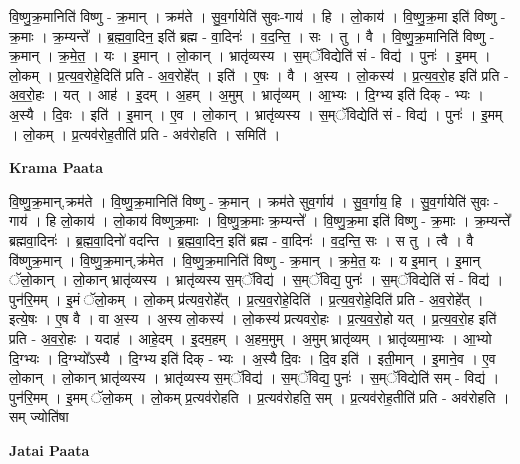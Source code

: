 \documentclass[17pt]{extarticle}
\begin{document}
वि॒ष्णु॒क्र॒मानिति॑ विष्णु - क्र॒मान् । क्रम॑ते । सु॒व॒र्गायेति॑ सुवः-गाय॑ । हि । लो॒काय॑ । वि॒ष्णु॒क्र॒मा इति॑ विष्णु - क्र॒माः । क्र॒म्यन्ते᳚ । ब्र॒ह्म॒वा॒दिन॒ इति॑ ब्रह्म - वा॒दिनः॑ । व॒द॒न्ति॒ । सः । तु । वै । वि॒ष्णु॒क्र॒मानिति॑ विष्णु - क्र॒मान् । क्र॒मे॒त॒ । यः । इ॒मान् । लो॒कान् । भ्रातृ॑व्यस्य । स॒म्ॅविद्येति॑ सं - विद्य॑ । पुनः॑ । इ॒मम् । लो॒कम् । प्र॒त्य॒व॒रोहे॒दिति॑ प्रति - अ॒व॒रोहे᳚त् । इति॑ । ए॒षः । वै । अ॒स्य । लो॒कस्य॑ । प्र॒त्य॒व॒रो॒ह इति॑ प्रति - अ॒व॒रो॒हः । यत् । आह॑ । इ॒दम् । अ॒हम् । अ॒मुम् । भ्रातृ॑व्यम् । आ॒भ्यः । दि॒ग्भ्य इति॑ दिक् - भ्यः । अ॒स्यै । दि॒वः । इति॑ । इ॒मान् । ए॒व । लो॒कान् । भ्रातृ॑व्यस्य । स॒म्ॅविद्येति॑ सं - विद्य॑ । पुनः॑ । इ॒मम् । लो॒कम् । प्र॒त्यव॑रोह॒तीति॑ प्रति - अव॑रोहति । समिति॑ ।  \newline


\textbf{Krama Paata} \newline

वि॒ष्णु॒क्र॒मान्,क्रम॑ते । वि॒ष्णु॒क्र॒मानिति॑ विष्णु - क्र॒मान् । क्रम॑ते सुव॒र्गाय॑ । सु॒व॒र्गाय॒ हि । सु॒व॒र्गायेति॑ सुवः - गाय॑ । हि लो॒काय॑ । लो॒काय॑ विष्णुक्र॒माः । वि॒ष्णु॒क्र॒माः क्र॒म्यन्ते᳚ । वि॒ष्णु॒क्र॒मा इति॑ विष्णु - क्र॒माः । क्र॒म्यन्ते᳚ ब्रह्मवा॒दिनः॑ । ब्र॒ह्म॒वा॒दिनो॑ वदन्ति । ब्र॒ह्म॒वा॒दिन॒ इति॑ ब्रह्म - वा॒दिनः॑ । व॒द॒न्ति॒ सः । स तु । त्वै । वै वि॑ष्णुक्र॒मान् । वि॒ष्णु॒क्र॒मान्,क्र॑मेत । वि॒ष्णु॒क्र॒मानिति॑ विष्णु - क्र॒मान् । क्र॒मे॒त॒ यः । य इ॒मान् । इ॒मान् ॅलो॒कान् । लो॒कान् भ्रातृ॑व्यस्य । भ्रातृ॑व्यस्य स॒म्ॅविद्य॑ । स॒म्ॅविद्य॒ पुनः॑ । स॒म्ॅविद्येति॑ सं - विद्य॑ । पुन॑रि॒मम् । इ॒मं ॅलो॒कम् । लो॒कम् प्र॑त्यव॒रोहे᳚त् । प्र॒त्य॒व॒रोहे॒दिति॑ । प्र॒त्य॒व॒रोहे॒दिति॑ प्रति - अ॒व॒रोहे᳚त् । इत्ये॒षः । ए॒ष वै । वा अ॒स्य । अ॒स्य लो॒कस्य॑ । लो॒कस्य॑ प्रत्यवरो॒हः । प्र॒त्य॒व॒रो॒हो यत् । प्र॒त्य॒व॒रो॒ह इति॑ प्रति - अ॒व॒रो॒हः । यदाह॑ । आहे॒दम् । इ॒दम॒हम् । अ॒हम॒मुम् । अ॒मुम् भ्रातृ॑व्यम् । भ्रातृ॑व्यमा॒भ्यः । आ॒भ्यो दि॒ग्भ्यः । दि॒ग्भ्यो᳚ऽस्यै । दि॒ग्भ्य इति॑ दिक् - भ्यः । अ॒स्यै दि॒वः । दि॒व इति॑ । इती॒मान् । इ॒माने॒व । ए॒व लो॒कान् । लो॒कान् भ्रातृ॑व्यस्य । भ्रातृ॑व्यस्य स॒म्ॅविद्य॑ । स॒म्ॅविद्य॒ पुनः॑ । स॒म्ॅविद्येति॑ सम् - विद्य॑ । पुन॑रि॒मम् । इ॒मम् ॅलो॒कम् । लो॒कम् प्र॒त्यव॑रोहति । प्र॒त्यव॑रोहति॒ सम् । प्र॒त्यव॑रोह॒तीति॑ प्रति - अव॑रोहति । सम् ज्योति॑षा \newline

\textbf{Jatai Paata} \newline
\end{document}
